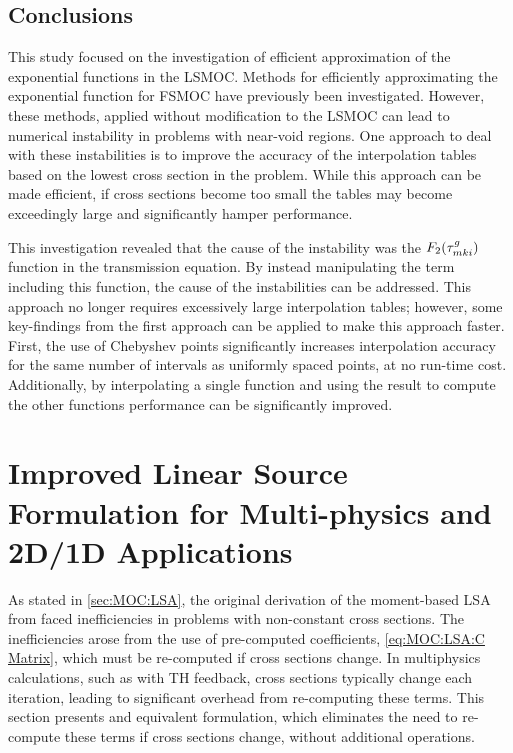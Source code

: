 {{    \subsection{Conclusions}{\label{ssec:LSMOC:ET:Conclusions}
      This study focused on the investigation of efficient approximation of the exponential functions in the \ac{LSMOC}.
      Methods for efficiently approximating the exponential function for \ac{FSMOC} have previously been investigated.
      However, these methods, applied without modification to the \ac{LSMOC} can lead to numerical instability in problems with near-void regions.
      One approach to deal with these instabilities is to improve the accuracy of the interpolation tables based on the lowest cross section in the problem.
      While this approach can be made efficient, if cross sections become too small the tables may become exceedingly large and significantly hamper performance.

      This investigation revealed that the cause of the instability was the $F_2(\segopt)$ function in the transmission equation.
      By instead manipulating the term including this function, the cause of the instabilities can be addressed.
      This approach no longer requires excessively large interpolation tables; however, some key-findings from the first approach can be applied to make this approach faster.
      First, the use of Chebyshev points significantly increases interpolation accuracy for the same number of intervals as uniformly spaced points, at no run-time cost.
      Additionally, by interpolating a single function and using the result to compute the other functions performance can be significantly improved.
    }
  }
  \section{Improved Linear Source Formulation for Multi-physics and 2D/1D Applications}{\label{sec:Improved Linear Source Formulation for Multi-physics and 2D/1D Applications}
    As stated in \cref{sec:MOC:LSA}, the original derivation of the moment-based \acf{LSA} from \citet{Ferrer2016} faced inefficiencies in problems with non-constant cross sections.
    The inefficiencies arose from the use of pre-computed coefficients, \cref{eq:MOC:LSA:C Matrix}, which must be re-computed if cross sections change.
    In multiphysics calculations, such as with \ac{TH} feedback, cross sections typically change each iteration, leading to significant overhead from re-computing these terms.
    This section presents and equivalent formulation, which eliminates the need to re-compute these terms if cross sections change, without additional operations.

}}
